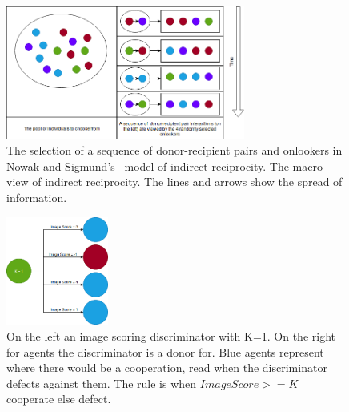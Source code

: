 \documentclass[]{final_report}
\begin{document}
\begin{figure}
	\center
	\includegraphics[width=0.7\textwidth]{Onlookers.png}
	\caption{The selection of a sequence of donor-recipient pairs and onlookers in Nowak and Sigmund's~\cite{evol_indirect_image} model of indirect reciprocity. The macro view of indirect reciprocity. The lines and arrows show the spread of information.}
	\label{fig:onlookers}
\end{figure}
\begin{figure}
	\center
	\includegraphics[width=0.3\textwidth]{Image_Scoring.png}
	\caption{On the left an image scoring discriminator with K=1. On the right for agents the discriminator is a donor for. Blue agents represent where there would be a cooperation, read when the discriminator defects against them. The rule is when $Image Score >= K$ cooperate else defect.}
	\label{fig:image_discriminator}
\end{figure}
\end{document}

